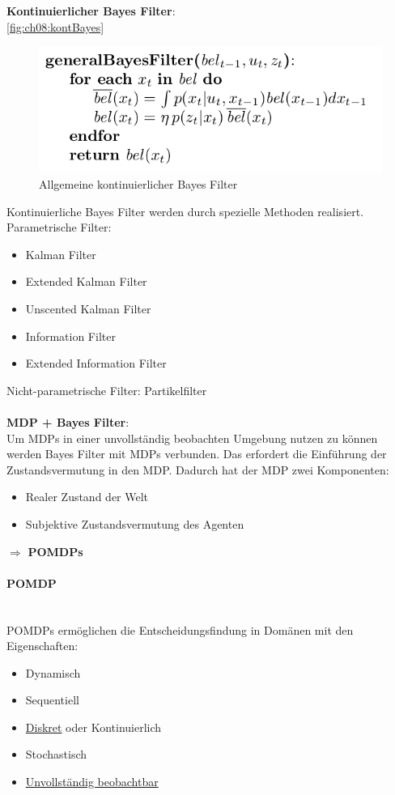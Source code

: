 \textbf{Kontinuierlicher Bayes Filter}:\\
\autoref{fig:ch08:kontBayes}
\begin{figure}[h!]
	\centering
  \includegraphics[width=0.5\linewidth]{figures/ch08_kontinuierlicherBayes.png}
\caption{Allgemeine kontinuierlicher Bayes Filter}
\label{fig:ch08:kontBayes}
\end{figure}
Kontinuierliche Bayes Filter werden durch spezielle Methoden realisiert.\\
Parametrische Filter:
\begin{itemize}
	\item Kalman Filter
	\item Extended Kalman Filter
	\item Unscented Kalman Filter
	\item Information Filter
	\item Extended Information Filter
\end{itemize}
Nicht-parametrische Filter: Partikelfilter\\ \\
\textbf{MDP + Bayes Filter}:\\
Um MDPs in einer unvollst\"andig beobachten Umgebung nutzen zu k\"onnen werden Bayes Filter mit MDPs verbunden.
Das erfordert die Einf\"uhrung der Zustandsvermutung in den MDP.
Dadurch hat der MDP zwei Komponenten:
\begin{itemize}
	\item Realer Zustand der Welt
	\item Subjektive Zustandsvermutung des Agenten
\end{itemize}
$\Rightarrow$ \textbf{POMDPs}
\paragraph{POMDP} {\ }\\
POMDPs ermöglichen die Entscheidungsfindung in Domänen mit den Eigenschaften:
\begin{itemize}
	\item Dynamisch
	\item Sequentiell
	\item \underline{Diskret} oder Kontinuierlich
	\item Stochastisch
	\item \underline{Unvollst\"andig beobachtbar}
\end{itemize}

